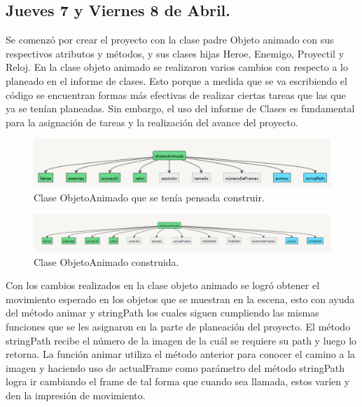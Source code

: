 \documentclass{article}
\begin{document}
\subsection{Jueves 7 y Viernes 8 de Abril.}

Se comenzó por crear el proyecto con la clase padre Objeto animado con sus respectivos atributos y métodos, y sus clases hijas Heroe, Enemigo, Proyectil y Reloj.
En la clase objeto animado se realizaron varios cambios con respecto a lo planeado en el informe de clases. Esto porque a medida que se va escribiendo el código se encuentran formas más efectivas de realizar ciertas tareas que las que ya se tenían planeadas. Sin embargo, el uso del informe de Clases es fundamental para la asignación de tareas y la realización del avance del proyecto.

\begin{figure}[h]
\includegraphics[scale=0.5]{Images/ObjetoAnimado.png}
\centering
\caption{Clase ObjetoAnimado que se tenía pensada construir.}
\label{fig:objetoAnimado}
\end{figure}

\begin{figure}[h]
\includegraphics[scale=0.6]{Images/newObjetoanimado.png}
\centering
\caption{Clase ObjetoAnimado construida.}
\label{fig:newobjetoAnimado}
\end{figure}

Con los cambios realizados en la clase objeto animado se logró obtener el movimiento esperado en los objetos que se muestran en la escena, esto con ayuda del método animar y stringPath los cuales siguen cumpliendo las mismas funciones que se les asignaron en la parte de planeación del proyecto. El método stringPath recibe el número de la imagen de la cuál se requiere su path y luego lo retorna. La función animar utiliza el método anterior para conocer el camino a la imagen y haciendo uso de actualFrame como parámetro del método stringPath logra ir cambiando el frame de tal forma que cuando sea llamada, estos varíen y den la impresión de movimiento.
\end{document}
